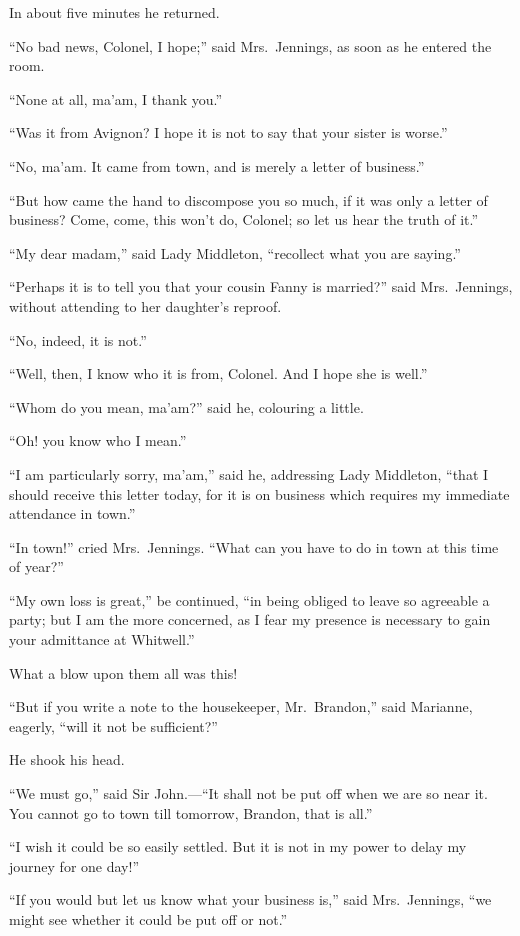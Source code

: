 \documentclass{article}
\begin{document}
In about five minutes he returned.

``No bad news, Colonel, I hope;'' said Mrs.\ Jennings,
as soon as he entered the room.

``None at all, ma'am, I thank you.''

``Was it from Avignon?  I hope it is not to say
that your sister is worse.''

``No, ma'am. It came from town, and is merely
a letter of business.''

``But how came the hand to discompose you so much,
if it was only a letter of business?  Come, come,
this won't do, Colonel; so let us hear the truth of it.''

``My dear madam,'' said Lady Middleton, ``recollect what
you are saying.''

``Perhaps it is to tell you that your cousin Fanny
is married?'' said Mrs.\ Jennings, without attending
to her daughter's reproof.

``No, indeed, it is not.''

``Well, then, I know who it is from, Colonel.  And I
hope she is well.''

``Whom do you mean, ma'am?'' said he, colouring a little.

``Oh! you know who I mean.''

``I am particularly sorry, ma'am,'' said he,
addressing Lady Middleton, ``that I should receive this
letter today, for it is on business which requires
my immediate attendance in town.''

``In town!'' cried Mrs.\ Jennings.  ``What can you
have to do in town at this time of year?''

``My own loss is great,'' be continued, ``in being obliged
to leave so agreeable a party; but I am the more concerned,
as I fear my presence is necessary to gain your admittance
at Whitwell.''

What a blow upon them all was this!

``But if you write a note to the housekeeper, Mr.\ Brandon,''
said Marianne, eagerly, ``will it not be sufficient?''

He shook his head.

``We must go,'' said Sir John.---``It shall not be put
off when we are so near it.  You cannot go to town till
tomorrow, Brandon, that is all.''

``I wish it could be so easily settled.  But it
is not in my power to delay my journey for one day!''

``If you would but let us know what your business is,''
said Mrs.\ Jennings, ``we might see whether it could be put
off or not.''
\end{document}
